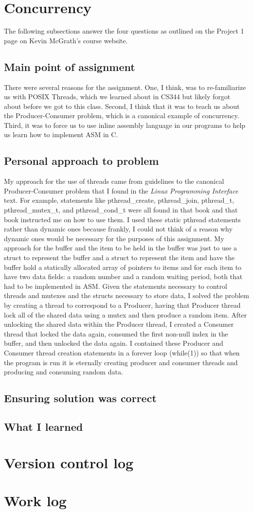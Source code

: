 \documentclass[letterpaper,10pt,titlepage]{article}
\begin{document}
\section{Concurrency}
The following subsections answer the four questions as outlined on the Project 1 page on Kevin McGrath's course website.
\subsection{Main point of assignment}
There were several reasons for the assignment. One, I think, was to re-familiarize us with POSIX Threads, which we learned about in CS344 but likely forgot about before we got to this class. Second, I think that it was to teach us about the Producer-Consumer problem, which is a canonical example of concurrency. Third, it was to force us to use inline assembly language in our programs to help us learn how to implement ASM in C.
\subsection{Personal approach to problem}
My approach for the use of threads came from guidelines to the canonical Producer-Consumer problem that I found in the \emph{Linux Programming Interface} text. For example, statements like pthread\_create, pthread\_join, pthread\_t, pthread\_mutex\_t, and pthread\_cond\_t were all found in that book and that book instructed me on how to use them. I used these static pthread statements rather than dynamic ones because frankly, I could not think of a reason why dynamic ones would be necessary for the purposes of this assignment. My approach for the buffer and the item to be held in the buffer was just to use a struct to represent the buffer and a struct to represent the item and have the buffer hold a statically allocated array of pointers to items and for each item to have two data fields: a random number and a random waiting period, both that had to be implemented in ASM. Given the statements necessary to control threads and mutexes and the structs necessary to store data, I solved the problem by creating a thread to correspond to a Producer, having that Producer thread lock all of the shared data using a mutex and then produce a random item. After unlocking the shared data within the Producer thread, I created a Consumer thread that locked the data again, consumed the first non-null index in the buffer, and then unlocked the data again. I contained these Producer and Consumer thread creation statements in a forever loop (while(1)) so that when the program is run it is eternally creating producer and consumer threads and producing and consuming random data. 
\subsection{Ensuring solution was correct}
\subsection{What I learned}

\section{Version control log}

\section{Work log}

%
%
\end{document}
